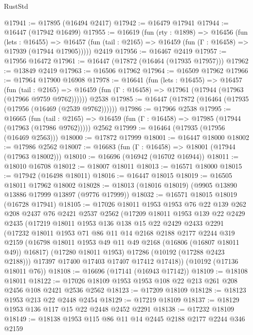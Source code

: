 \begin{lexlean}{RustStd}
\begin{coremodule}
@17941 := @17895 (@16494 @2417)
@17942 := @16479 @17941
@17944 := @16447 (@17942 @16499)
@17955 := @16619
    (fun (rty : @1898) =>
    @16456
      (fun (lets : @16455) =>
      @16457 (fun (tail : @2165) => @16459 (fun (Γ : @16458) => @17939 (@17944 @17905)))))
    @2419
@17956 := @16467 @2419
@17957 := @17956 @16472
@17961 := @16447 (@17872 (@16464 (@17935 @17957)))
@17962 := @13849 @2419
@17963 := @16506 @17962
@17964 := @16509 @17962
@17966 := @17964 @17900 @16908
@17978 := @16641
    (fun (lets : @16455) =>
    @16457
      (fun (tail : @2165) =>
      @16459 (fun (Γ : @16458) => @17961 (@17944 (@17963 (@17966 @9759 @9762))))))
    @2538
@17985 := @16447 (@17872 (@16464 (@17935 (@17956 (@16469 (@2539 @9762))))))
@17986 := @17966 @2538
@17995 := @16665
    (fun (tail : @2165) => @16459 (fun (Γ : @16458) => @17985 (@17944 (@17963 (@17986 @9762)))))
    @2562
@17999 := @16464 (@17935 (@17956 (@16469 @2563)))
@18000 := @17872 @17999
@18001 := @16447 @18000
@18002 := @17986 @2562
@18007 := @16683 (fun (Γ : @16458) => @18001 (@17944 (@17963 @18002)))
@18010 := @16696 (@16942 (@16702 @16944))
@18011 := @18010 @16708
@18012 := @18007 @18011
@18013 := @16571 @18000
@18015 := @17942 (@16498 @18011)
@18016 := @16447 @18015
@18019 := @16505 @18011 @17962 @18002
@18028 := @18013 (@18016 @18019) (@9905 @13890 @13886 @17999 @13897 (@9776 @17999))
@18032 := @16571 @18015 @18019 (@16728 @17941)
@18105 := @17026
    @18011
    @1953
    @1953
    @76
    @22
    @139
    @262
    @208
    @2437
    @76
    @2421
    @2537
    @2562
    (@17209
      @18011
      @1953
      @139
      @22
      @2429
      @2435
      (@17219
        @18011
        @1953
        @136
        @138
        @15
        @22
        @2429
        @2433
        @2291
        (@17232
          @18011
          @1953
          @71
          @86
          @11
          @14
          @2168
          @2188
          @2177
          @2244
          @319
          @2159
          (@16798 @18011 @1953 @49 @11 @49 @2168 (@16806 (@16807 @18011 @49)) @16817)
          (@17280 @18011 @1953)
          @17286
          (@10192 (@17288 @2423 @2188)))
        @17397
        @17400
        @17403
        @17407
        @17412
        @17418))
    (@10192 (@17136 @18011 @76))
@18108 := @16696 (@17141 (@16943 @17142))
@18109 := @18108 @18011
@18122 := @17026 @18109 @1953 @1953 @108 @22 @213 @261 @208 @2456 @108 @2421 @2536 @2562
@18123 := @17209 @18109
@18128 := @18123 @1953 @213 @22 @2448 @2454
@18129 := @17219 @18109
@18137 := @18129 @1953 @136 @117 @15 @22 @2448 @2452 @2291
@18138 := @17232 @18109
@18149 := @18138 @1953 @115 @86 @11 @14 @2445 @2188 @2177 @2244 @346 @2159

\end{coremodule}
\end{lexlean}
